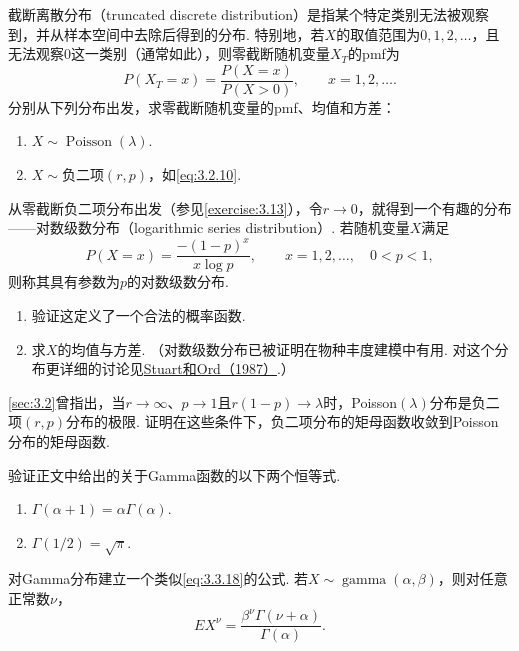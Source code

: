 \begin{exercise}\label{exercise:3.13}
截断离散分布（truncated discrete distribution）是指某个特定类别无法被观察到，并从样本空间中去除后得到的分布. 特别地，若$X$的取值范围为$0,1,2,\ldots$，且无法观察0这一类别（通常如此），则零截断随机变量$X_T$的pmf为
$$P(X_T=x)=\frac{P(X=x)}{P(X>0)},\qquad x=1,2,\ldots.$$
分别从下列分布出发，求零截断随机变量的pmf、均值和方差：
\begin{enumerate}
\item[(a)] $X\sim\operatorname{Poisson}(\lambda)$.
\item[(b)] $X\sim\text{负二项}(r,p)$，如\eqref{eq:3.2.10}.
\end{enumerate}
\end{exercise}
\begin{exercise}\label{exercise:3.14}
从零截断负二项分布出发（参见\autoref{exercise:3.13}），令$r\to0$，就得到一个有趣的分布——对数级数分布（logarithmic series distribution）. 若随机变量$X$满足
$$P(X=x)=\frac{-(1-p)^x}{x\log p},\qquad x=1,2,\ldots,\quad0<p<1,$$
则称其具有参数为$p$的对数级数分布.
\begin{enumerate}
\item[(a)] 验证这定义了一个合法的概率函数.
\item[(b)] 求$X$的均值与方差. （对数级数分布已被证明在物种丰度建模中有用. 对这个分布更详细的讨论见\hyperref[bib:source309]{Stuart和Ord（1987）}.）
\end{enumerate}
\end{exercise}
\begin{exercise}\label{exercise:3.15}
\autoref{sec:3.2}曾指出，当$r\to\infty$、$p\to1$且$r(1-p)\to\lambda$时，Poisson$(\lambda)$分布是负二项$(r,p)$分布的极限. 证明在这些条件下，负二项分布的矩母函数收敛到Poisson分布的矩母函数.
\end{exercise}
\begin{exercise}\label{exercise:3.16}
验证正文中给出的关于Gamma函数的以下两个恒等式.
\begin{enumerate}
\item[(a)] $\Gamma(\alpha+1)=\alpha\Gamma(\alpha)$.
\item[(b)] $\Gamma(1/2)=\sqrt\pi$.
\end{enumerate}
\end{exercise}
\begin{exercise}\label{exercise:3.17}
对Gamma分布建立一个类似\eqref{eq:3.3.18}的公式. 若$X\sim\operatorname{gamma}(\alpha,\beta)$，则对任意正常数$\nu$，
$$EX^\nu=\frac{\beta^\nu\Gamma(\nu+\alpha)}{\Gamma(\alpha)}.$$
\end{exercise}
